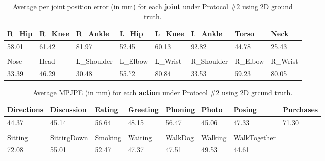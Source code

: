 
\begin{table}[h]
    \centering
    \footnotesize
    \begin{tabularx}{\textwidth}{XXXXXXXX}
        \toprule
        R\_Hip & R\_Knee & R\_Ankle    & L\_Hip   & L\_Knee  & L\_Ankle    & Torso    & Neck \\
        \hline
        58.01  & 61.42   & 81.97       & 52.45    & 60.13    & 92.82       & 44.78    & 25.43 \\
        &&&&&&&\\
        Nose   & Head    & L\_Shoulder & L\_Elbow & L\_Wrist & R\_Shoulder & R\_Elbow & R\_Wrist\\
        \hline
        33.39  & 46.29   & 30.48       & 55.72    & 80.84    & 33.53       & 59.23    & 80.05\\
        \bottomrule
    \end{tabularx}
    \caption{Average per joint position error (in mm) for each \textbf{joint} under Protocol $\#2$ using 2D ground truth.}
    \label{table:pjpe}
\end{table}

\begin{table}[h]
    \centering
    \footnotesize
    \begin{tabularx}{\textwidth}{XXXXXXXX}
        \toprule
        Directions & Discussion& Eating& Greeting& Phoning& Photo& Posing& Purchases \\
        \hline
        44.37  & 45.14   & 56.64       & 48.15    & 56.47    & 45.06       & 47.33    & 71.30  \\
        &&&&&&&\\
        Sitting& SittingDown& Smoking& Waiting& WalkDog& Walking& WalkTogether& \\
        \hline
        72.08  & 55.01   & 52.47       & 47.37    & 47.51    & 49.53       & 44.61    &  \\
        \bottomrule
    \end{tabularx}
    \caption{Average MPJPE (in mm) for each \textbf{action} under Protocol $\#2$ using 2D ground truth.}
    \label{table:pjpe_a}
\end{table}